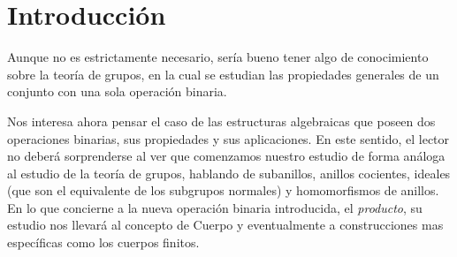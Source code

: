 \thispagestyle{plain}
\chapter{Introducción}%
\label{cha:Introducción}

{\noindent Aunque no es estrictamente necesario, sería bueno tener algo de conocimiento sobre la teoría de grupos, en la cual se estudian las propiedades generales de un conjunto con una sola operación binaria.}

Nos interesa ahora pensar el caso de las estructuras algebraicas que poseen dos operaciones binarias, sus propiedades y sus aplicaciones. En este sentido, el lector no deberá sorprenderse al ver que comenzamos nuestro estudio de forma análoga al estudio de la teoría de grupos, hablando de subanillos, anillos cocientes, ideales (que son el equivalente de los subgrupos normales) y homomorfismos de anillos. En lo que concierne a la nueva operación binaria introducida, el \textit{producto}, su estudio nos llevará al concepto de Cuerpo y eventualmente a construcciones mas específicas como los cuerpos finitos.
